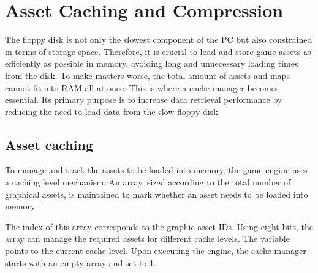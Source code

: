\documentclass[book.tex]{subfiles}
\begin{document}
\label{chapter_cache_compression}
\section{Asset Caching and Compression}

The floppy disk is not only the slowest component of the PC but also constrained in terms of storage space. Therefore, it is crucial to load and store game assets as efficiently as possible in memory, avoiding long and unnecessary loading times from the disk. To make matters worse, the total amount of assets and maps cannot fit into RAM all at once. This is where a cache manager becomes essential. Its primary purpose is to increase data retrieval performance by reducing the need to load data from the slow floppy disk. 

\subsection{Asset caching}
To manage and track the assets to be loaded into memory, the game engine uses a caching level mechanism. An array, sized according to the total number of graphical assets, is maintained to mark whether an asset needs to be loaded into memory. \\

 
\par
The index of this array corresponds to the graphic asset IDs. Using eight bits, the array can manage the required assets for different cache levels. The  variable points to the current cache level. Upon executing the engine, the cache manager starts with an empty array and  set to 1.\\
\end{document}
